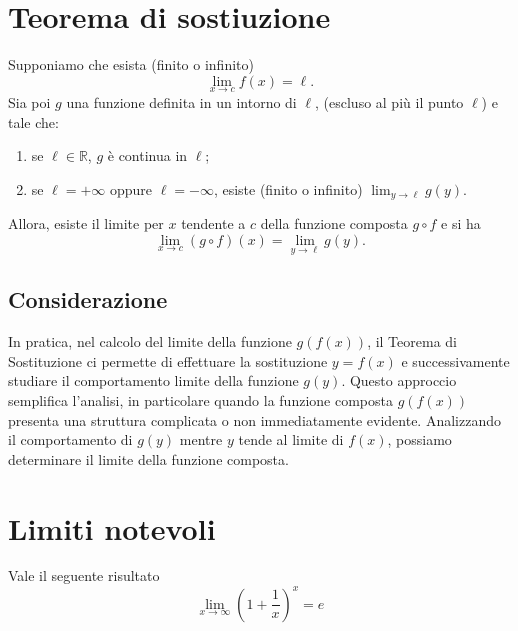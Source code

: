 \documentclass{book}
\begin{document}
\section{Teorema di sostiuzione}
\noindent\begin{minipage}{\textwidth}
    \begin{theorem}
        Supponiamo che esista (finito o infinito)
        \[\lim_{x \to c} f(x) = \ell.\]
        Sia poi \( g \) una funzione definita in un intorno di \( \ell \), (escluso al più il punto \( \ell \)) e tale che:
        \begin{enumerate}
            \item se \( \ell \in \mathbb{R} \), \( g \) è continua in \( \ell \);
            \item se \( \ell = +\infty \) oppure \( \ell = -\infty \), esiste (finito o infinito) \(\lim_{y \to \ell} g(y)\).
        \end{enumerate}
        Allora, esiste il limite per \( x \) tendente a \( c \) della funzione composta \( g \circ f \) e si ha
        \[\lim_{x \to c} (g \circ f)(x) = \lim_{y \to \ell} g(y).\]
    \end{theorem}
\end{minipage}
\subsection*{Considerazione}
In pratica, nel calcolo del limite della funzione \( g(f(x)) \), il Teorema di Sostituzione ci permette di effettuare la sostituzione \( y = f(x) \) e successivamente studiare il comportamento limite della funzione \( g(y) \). Questo approccio semplifica l'analisi, in particolare quando la funzione composta \( g(f(x)) \) presenta una struttura complicata o non immediatamente evidente. Analizzando il comportamento di \( g(y) \) mentre \( y \) tende al limite di \( f(x) \), possiamo determinare il limite della funzione composta.

\section{Limiti notevoli}

\begin{proposition}
    Vale il seguente risultato
    \[
        \lim_{{x \to \infty}} \left(1 + \frac{1}{x}\right)^x = e
    \]
\end{proposition}
\end{document}
